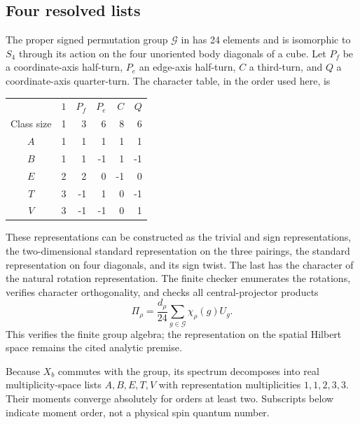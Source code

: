 \subsection{Four resolved lists}
The proper signed permutation group $\mathcal G$ in
\cite[Proposition 3.1]{upstream} has 24 elements and is isomorphic to
$S_4$ through its action on the four unoriented body diagonals of a cube.
Let $P_f$ be a coordinate-axis half-turn, $P_e$ an edge-axis half-turn,
$C$ a third-turn, and $Q$ a coordinate-axis quarter-turn. The character
table, in the order used here, is
\begin{center}
\begin{tabular}{c|rrrrr}
 & $1$ & $P_f$ & $P_e$ & $C$ & $Q$\\
Class size & 1 & 3 & 6 & 8 & 6\\\hline
$A$ & 1 & 1 & 1 & 1 & 1\\
$B$ & 1 & 1 & -1 & 1 & -1\\
$E$ & 2 & 2 & 0 & -1 & 0\\
$T$ & 3 & -1 & 1 & 0 & -1\\
$V$ & 3 & -1 & -1 & 0 & 1
\end{tabular}
\end{center}
These representations can be constructed as the trivial and sign
representations, the two-dimensional standard representation on the
three pairings, the standard representation on four diagonals, and
its sign twist. The last has the character of the natural rotation
representation. The finite checker enumerates the rotations, verifies
character orthogonality, and checks all central-projector products
\[
 \Pi_\rho=\frac{d_\rho}{24}\sum_{g\in\mathcal G}
                  \chi_\rho(g)U_g.
\]
This verifies the finite group algebra; the representation on the
spatial Hilbert space remains the cited analytic premise.

Because $X_b$ commutes with the group, its spectrum decomposes into
real multiplicity-space lists $A,B,E,T,V$ with representation
multiplicities $1,1,2,3,3$. Their moments converge absolutely for orders
at least two. Subscripts below indicate moment order, not a physical
spin quantum number.

